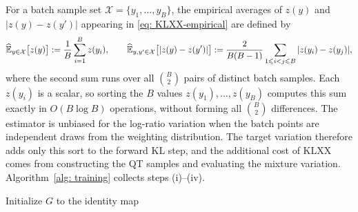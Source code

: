 \documentclass{article}
\begin{document}
For a batch sample set $\mathcal X = \{y_1,\dots,y_B\}$, the empirical averages of $z(y)$ and $|z(y)-z(y')|$ appearing in \eqref{eq: KLXX-empirical} are defined by
\begin{equation}
	\widehat{\mathbb E}_{y\in \mathcal X} \big[z(y)\big] := \frac1B \sum_{i=1}^B z(y_i), \qquad \widehat{\mathbb E}_{y,y'\in \mathcal X} \big[|z(y)-z(y')|\big] := \frac{2}{B(B-1)}\sum_{1\leqslant i<j\leqslant B} |z(y_i) - z(y_j)|,
	\label{eq: empirical-variation}
\end{equation}
where the second sum runs over all $\binom{B}{2}$ pairs of distinct batch samples. Each $z(y_i)$ is a scalar, so sorting the $B$ values $z(y_1),\dots,z(y_B)$ computes this sum exactly in $O(B\log B)$ operations, without forming all $\binom{B}{2}$ differences. The estimator is unbiased for the log-ratio variation when the batch points are independent draws from the weighting distribution. The target variation therefore adds only this sort to the forward KL step, and the additional cost of KLXX comes from constructing the QT samples and evaluating the mixture variation. Algorithm~\ref{alg: training} collects steps (i)--(iv).

\begin{algorithm}[htb]
\caption{KLXX training algorithm}
\label{alg: training}
Initialize $G$ to the identity map\;
\end{algorithm}
\end{document}
